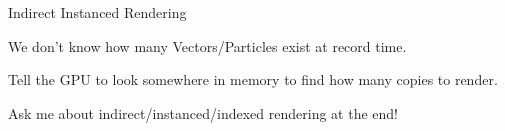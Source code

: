 \begin{frame}{Indirect Instanced Rendering}
{\begin{tikzpicture}[
    scale=0.9, every node/.style={scale=0.9},
fixedrect/.style={rectangle,draw,minimum height=4em,anchor=west,text width=2cm,align=center},
]

    \end{tikzpicture}
    }

    \vfill\null
    \begin{wideitemize}
        \item We don't know how many Vectors/Particles exist at record time.
        \item Tell the GPU to look somewhere in memory to find how many copies to render.
    \end{wideitemize}
    \vfill\null
    \begin{center}
        Ask me about indirect/instanced/indexed rendering at the end!
    \end{center}
\end{frame}

\newcommand{\basevizvulkancommand}{

        
    \begin{scope}[overlay]
        \node[fixedrect,
        rectangle split,
        rectangle split parts=2,
        rectangle split horizontal,
        rectangle split draw splits=false,
        text width=7cm](vc_overall) at (0,0){Viz Compute\nodepart{two}};%
        \node[fixedrect,fill=white,draw=white,path fading=west,minimum width=2cm,anchor=east,minimum height=50em](fade) at (13cm,0){};
        \node[fixedrect,fill=white,draw=white,minimum width=2cm,anchor=west,minimum height=50em] at (fade.east){};
    \end{scope}
}

